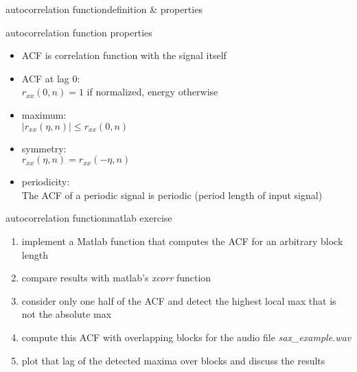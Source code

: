         \begin{frame}{autocorrelation function}{definition \& properties}
            \vspace{-12mm}
            \toremember{}
            \begin{block}{autocorrelation function properties}
                \begin{itemize}
                    \item   ACF is correlation function with the signal itself
                    \item	{ACF} at lag $0$:\\
                    $r_{xx}(0,n) = 1$ if normalized, energy otherwise
                
                    \item	maximum:\\
                    $|r_{xx}(\eta,n)| \leq r_{xx}(0,n)$ 
                    \item	symmetry:\\
                    $r_{xx}(\eta,n) = r_{xx}(-\eta,n)$
                    \item	periodicity:\\
                    The {ACF} of a periodic signal is periodic (period length of input signal)
                \end{itemize}	
            \end{block}
        \end{frame}	
        
        \begin{frame}{autocorrelation function}{matlab exercise}
            
            \begin{enumerate}
                \item   implement a Matlab function that computes the ACF for an arbitrary block length
                \item   compare results with matlab's \textsl{xcorr} function
                \item   consider only one half of the ACF and detect the highest local max that is not the absolute max
                \item   compute this ACF with overlapping blocks for the audio file \textsl{sax\_example.wav} 
                \item   plot that lag of the detected maxima over blocks and discuss the results
            \end{enumerate}
        \end{frame}
 
